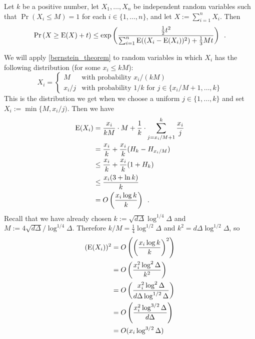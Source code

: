 \documentclass{patmorin}
\begin{document}
\begin{thm}\label{bernstein_theorem}
  Let $k$ be a positive number, let $X_1,\ldots,X_n$ be independent random variables such that $\Pr(X_i\le M)=1$ for each $i\in\{1,\ldots,n\}$, and let $X:=\sum_{i=1}^n X_i$. Then
  \begin{equation}
    \Pr\left(X \ge \mathrm{E}(X)+ t\right)
      \le \exp\left(\frac{\tfrac{1}{2}t^2}{\sum_{i=1}^n \mathrm{E}((X_i-\mathrm{E}(X_i))^2)+\tfrac{1}{3}Mt}\right) \enspace . \label{bernstein}
  \end{equation}
\end{thm}
We will apply \cref{bernstein_theorem} to random variables in which $X_i$ has the following distribution (for some $x_i\le kM$):
\[
  X_i = \begin{cases}
          M & \text{with probability $x_i/(kM)$} \\
          x_i/j & \text{with probability $1/k$ for $j\in\{x_i/M+1,\ldots,k\}$}
        \end{cases}
\]
This is the distribution we get when we choose a uniform $j\in\{1,\ldots,k\}$ and set $X_i:=\min\{M,x_i/j)$.
Then we have
\begin{align*}
  \mathrm{E}(X_i)
  & =\frac{x_i}{kM}\cdot M + \frac{1}{k}\cdot\sum_{j=x_i/M+1}^k \frac{x_i}{j} \\
  & = \frac{x_i}{k} + \frac{x_i}{k}(H_{k}-H_{x_i/M}) \\
  & \le \frac{x_i}{k} + \frac{x_i}{k}(1+H_{k}) \\
  & \le \frac{x_i(3+\ln k)}{k} \\
  & = O\left(\frac{x_i\log k}{k}\right) \enspace .
\end{align*}
Recall that we have already chosen $k:=\sqrt{d\Delta}\log^{1/4}\Delta$ and $M:=4\sqrt{d\Delta}/\log^{1/4}\Delta$.  Therefore $k/M=\tfrac{1}{4}\log^{1/2}\Delta$ and $k^2=d\Delta\log^{1/2}\Delta$, so
\begin{align*}
  (\E(X_i))^2
  & = O\left(\left(\frac{x_i\log k}{k}\right)^2\right) \\
  & = O\left(\frac{x_i^2\log^2 \Delta}{k^2}\right) \\
  & = O\left(\frac{x_i^2\log^2 \Delta}{d\Delta\log^{1/2}\Delta}\right) \\
  & = O\left(\frac{x_i^2\log^{3/2} \Delta}{d\Delta}\right) \\
  & = O(x_i\log^{3/2} \Delta)

\end{align*}
\end{document}
